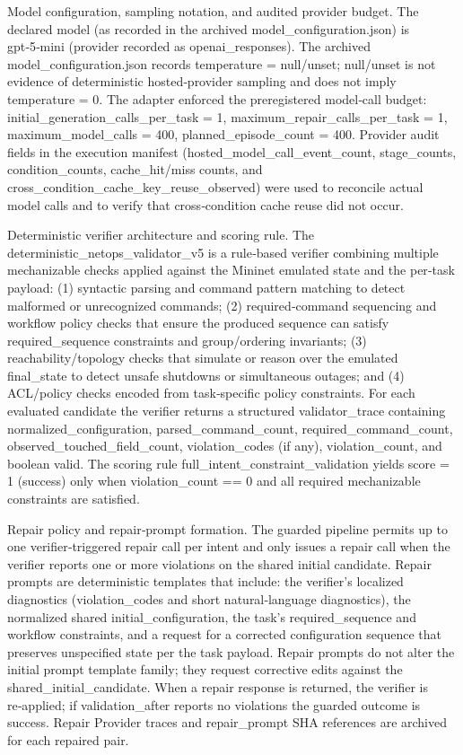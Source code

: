 \documentclass[conference]{IEEEtran}
\begin{document}
Model configuration, sampling notation, and audited provider budget. The declared model (as recorded in the archived model\_configuration.json) is gpt‑5‑mini (provider recorded as openai\_responses). The archived model\_configuration.json records temperature = null/unset; null/unset is not evidence of deterministic hosted‑provider sampling and does not imply temperature = 0. The adapter enforced the preregistered model‑call budget: initial\_generation\_calls\_per\_task = 1, maximum\_repair\_calls\_per\_task = 1, maximum\_model\_calls = 400, planned\_episode\_count = 400. Provider audit fields in the execution manifest (hosted\_model\_call\_event\_count, stage\_counts, condition\_counts, cache\_hit/miss counts, and cross\_condition\_cache\_key\_reuse\_observed) were used to reconcile actual model calls and to verify that cross‑condition cache reuse did not occur.

Deterministic verifier architecture and scoring rule. The deterministic\_netops\_validator\_v5 is a rule‑based verifier combining multiple mechanizable checks applied against the Mininet emulated state and the per‑task payload: (1) syntactic parsing and command pattern matching to detect malformed or unrecognized commands; (2) required‑command sequencing and workflow policy checks that ensure the produced sequence can satisfy required\_sequence constraints and group/ordering invariants; (3) reachability/topology checks that simulate or reason over the emulated final\_state to detect unsafe shutdowns or simultaneous outages; and (4) ACL/policy checks encoded from task‑specific policy constraints. For each evaluated candidate the verifier returns a structured validator\_trace containing normalized\_configuration, parsed\_command\_count, required\_command\_count, observed\_touched\_field\_count, violation\_codes (if any), violation\_count, and boolean valid. The scoring rule full\_intent\_constraint\_validation yields score = 1 (success) only when violation\_count == 0 and all required mechanizable constraints are satisfied.

Repair policy and repair‑prompt formation. The guarded pipeline permits up to one verifier‑triggered repair call per intent and only issues a repair call when the verifier reports one or more violations on the shared initial candidate. Repair prompts are deterministic templates that include: the verifier's localized diagnostics (violation\_codes and short natural‑language diagnostics), the normalized shared initial\_configuration, the task's required\_sequence and workflow constraints, and a request for a corrected configuration sequence that preserves unspecified state per the task payload. Repair prompts do not alter the initial prompt template family; they request corrective edits against the shared\_initial\_candidate. When a repair response is returned, the verifier is re‑applied; if validation\_after reports no violations the guarded outcome is success. Repair Provider traces and repair\_prompt SHA references are archived for each repaired pair.
\end{document}
